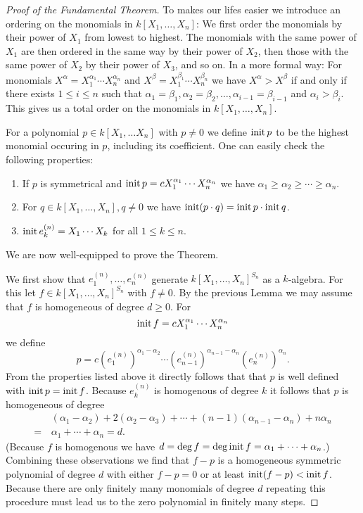 \begin{proof}[Proof of the Fundamental Theorem]
To makes our lifes easier we introduce an ordering on the monomials in $k[X_1, \dotsc, X_n]$: We first order the monomials by their power of $X_1$ from lowest to highest. The monomials with the same power of $X_1$ are then ordered in the same way by their power of $X_2$, then those with the same power of $X_2$ by their power of $X_3$, and so on. In a more formal way: For monomials $X^\alpha = X_1^{\alpha_1} \dotsm X_n^{\alpha_n}$ and $X^\beta = X_1^{\beta_1} \dotsm X_n^{\beta_n}$ we have $X^\alpha > X^\beta$ if and only if there exists $1 \leq i \leq n$ such that $\alpha_1 = \beta_1, \alpha_2 = \beta_2, \dotsc, \alpha_{i-1} = \beta_{i-1}$ and $\alpha_i > \beta_i$. This gives us a total order on the monomials in $k[X_1, \dotsc, X_n]$.
 
 For a polynomial $p \in k[X_1, \dotsc X_n]$ with $p \neq 0$ we define $\operatorname{init} p$ to be the highest monomial occuring in $p$, including its coefficient. One can easily check the following properties:
 \begin{enumerate}
  \item
   If $p$ is symmetrical and $\operatorname{init} p = c X_1^{\alpha_1} \dotsm X_n^{\alpha_n}$ we have $\alpha_1 \geq \alpha_2 \geq \dotsb \geq \alpha_n$.
  \item
   For $q \in k[X_1, \dotsc, X_n], q \neq 0$ we have $\operatorname{init} (p \cdot q) = \operatorname{init} p \cdot \operatorname{init} q$.
  \item
   $\operatorname{init} e^{(n)}_k = X_1 \dotsm X_k$ for all $1 \leq k \leq n$.
 \end{enumerate}
 We are now well-equipped to prove the Theorem. 
 
 We first show that $e^{(n)}_1, \dotsc, e^{(n)}_n$ generate $k[X_1, \dotsc, X_n]^{S_n}$ as a $k$-algebra. For this let $f \in k[X_1, \dotsc, X_n]^{S_n}$ with $f \neq 0$. By the previous Lemma we may assume that $f$ is homogeneous of degree $d \geq 0$. For
 \[
  \operatorname{init} f = c X_1^{\alpha_1} \dotsm X_n^{\alpha_n}
 \]
 we define
 \[
  p = c \left(e^{(n)}_1\right)^{\alpha_1 - \alpha_2} \dotsm \left(e^{(n)}_{n-1}\right)^{\alpha_{n-1} - \alpha_n} \left(e^{(n)}_n\right)^{\alpha_n}.
 \]
 From the properties listed above it directly follows that that $p$ is well defined with $\operatorname{init} p = \operatorname{init} f$. Because $e^{(n)}_k$ is homogenous of degree $k$ it follows that $p$ is homogeneous of degree
 \begin{align*}
   &\,(\alpha_1-\alpha_2) + 2(\alpha_2-\alpha_3) + \dotsb + (n-1)(\alpha_{n-1}-\alpha_n)+n\alpha_n \\
  =&\, \alpha_1 + \dotsb + \alpha_n
  = d.
 \end{align*}
 (Because $f$ is homogenous we have $d = \deg f = \deg \operatorname{init} f = \alpha_1 + \dotsb + \alpha_n$.) Combining these observations we find that $f-p$ is a homogeneous symmetric polynomial of degree $d$ with either $f-p = 0$ or at least $\operatorname{init} (f-p) < \operatorname{init} f$. Because there are only finitely many monomials of degree $d$ repeating this procedure must lead us to the zero polynomial in finitely many steps.
 

\end{proof}
